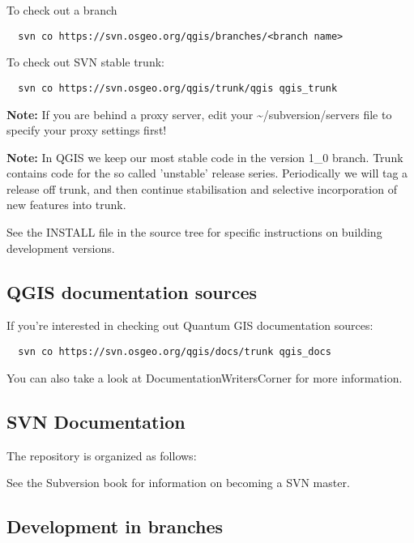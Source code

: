 To check out a branch

\begin{verbatim}
  svn co https://svn.osgeo.org/qgis/branches/<branch name>
\end{verbatim}

To check out SVN stable trunk:

\begin{verbatim}
  svn co https://svn.osgeo.org/qgis/trunk/qgis qgis_trunk
\end{verbatim}

\textbf{Note:} If you are behind a proxy server, edit your \~{}/subversion/servers
file to specify your proxy settings first!

\textbf{Note:} In QGIS we keep our most stable code in the version 1\_0 branch.
Trunk contains code for the so called 'unstable' release series. Periodically
we will tag a release off trunk, and then continue stabilisation and selective
incorporation of new features into trunk.

See the INSTALL file in the source tree for specific instructions on building
development versions. 

\hypertarget{toc32}{}
\subsection{QGIS documentation sources}
If you're interested in checking out Quantum GIS documentation sources:

\begin{verbatim}
  svn co https://svn.osgeo.org/qgis/docs/trunk qgis_docs
\end{verbatim}

You can also take a look at DocumentationWritersCorner for more information.

\hypertarget{toc33}{}
\subsection{SVN Documentation}
The repository is organized as follows:


See the Subversion book 
for information on becoming a SVN master.

\hypertarget{toc34}{}
\subsection{Development in branches}
\hypertarget{toc35}{}
